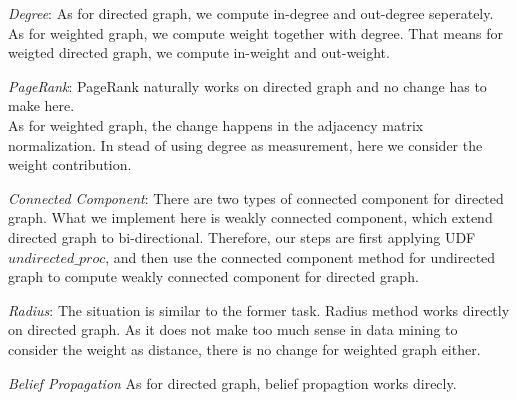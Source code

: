 \begin{itemize*}
\item {\em Degree}:
As for directed graph, we compute in-degree and out-degree seperately. \\
As for weighted graph, we compute weight together with degree. That means for weigted directed graph, we compute in-weight and out-weight.
\item {\em PageRank}:
PageRank naturally works on directed graph and no change has to make here. \\
As for weighted graph, the change happens in the adjacency matrix normalization. In stead of using degree as measurement, here we consider the weight contribution.
\item {\em Connected Component}:
There are two types of connected component for directed graph. What we implement here is weakly connected component, which extend directed graph to bi-directional. Therefore, our steps are first applying UDF $undirected\_proc$, and then use the connected component method for undirected graph to compute weakly connected component for directed graph.
\item {\em Radius}:
The situation is similar to the former task. Radius method works directly on directed graph. As it does not make too much sense in data mining to consider the weight as distance, there is no change for weighted graph either.
\item {\em Belief Propagation}
As for directed graph, belief propagtion works direcly.
\end{itemize*} 

